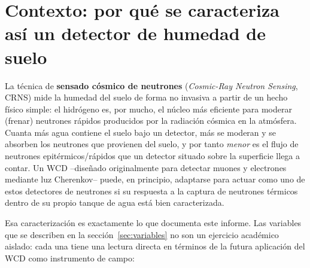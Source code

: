 \documentclass[11pt,a4paper]{article}
\begin{document}
\section{Contexto: por qué se caracteriza así un detector de humedad de suelo}
\label{sec:contexto}

La técnica de \textbf{sensado cósmico de neutrones} (\textit{Cosmic-Ray Neutron Sensing}, CRNS) mide
la humedad del suelo de forma no invasiva a partir de un hecho físico simple: el hidrógeno es, por
mucho, el núcleo más eficiente para moderar (frenar) neutrones rápidos producidos por la radiación
cósmica en la atmósfera. Cuanta más agua contiene el suelo bajo un detector, más se moderan y se
absorben los neutrones que provienen del suelo, y por tanto \emph{menor} es el flujo de neutrones
epitérmicos/rápidos que un detector situado sobre la superficie llega a contar. Un WCD --diseñado
originalmente para detectar muones y electrones mediante luz Cherenkov-- puede, en principio,
adaptarse para actuar como uno de estos detectores de neutrones si su respuesta a la captura de
neutrones térmicos dentro de su propio tanque de agua está bien caracterizada.

Esa caracterización es exactamente lo que documenta este informe. Las variables que se describen en
la sección~\ref{sec:variables} no son un ejercicio académico aislado: cada una tiene una lectura
directa en términos de la futura aplicación del WCD como instrumento de campo:
\end{document}
